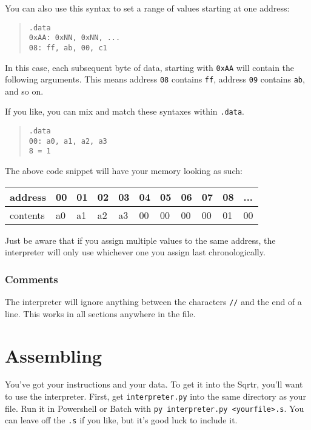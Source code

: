 \documentclass[12pt, oneside]{memoir}
\newcommand{\header}[1]{{\color{header}\texttt{#1}}}
\begin{document}
You can also use this syntax to set a range of values starting at one address:

\begin{quotation}\texttt{\header{.data}\\
    {\color{imm}0xAA}: {\color{imm}0xNN}, {\color{imm}0xNN}, ...\\
    {\color{imm}08}: {\color{imm}ff}, {\color{imm}ab}, {\color{imm}00}, {\color{imm}c1}
}\end{quotation}

In this case, each subsequent byte of data, starting with \texttt{{\color{imm}0xAA}} will contain the following arguments. This means address \texttt{{\color{imm}08}} contains \texttt{{\color{imm}ff}}, address \texttt{{\color{imm}09}} contains \texttt{{\color{imm}ab}}, and so on.

If you like, you can mix and match these syntaxes within \header{.data}.
\begin{quotation}\texttt{\header{.data}\\
    {\color{imm}00}: {\color{imm}a0}, {\color{imm}a1}, {\color{imm}a2}, {\color{imm}a3}\\
    {\color{imm}8} = {\color{imm}1}
}\end{quotation}
The above code snippet will have your memory looking as such:
\begin{table}[H]
    \begin{tabular}{|l|l|l|l|l|l|l|l|l|l|l|}
    \hline
    address  & 00 & 01 & 02 & 03 & 04 & 05 & 06 & 07 & 08 & ... \\ \hline
    contents & a0 & a1 & a2 & a3 & 00 & 00 & 00 & 00 & 01 & 00  \\ \hline
    \end{tabular}
\end{table}

Just be aware that if you assign multiple values to the same address, the interpreter will only use whichever one you assign last chronologically.

\subsection{Comments}
The interpreter will ignore anything between the characters \texttt{//} and the end of a line. This works in all sections anywhere in the file.

\chapter{Assembling}
You've got your instructions and your data. To get it into the Sqrtr, you'll want to use the interpreter. First, get \texttt{interpreter.py} into the same directory as your file. Run it in Powershell or Batch with \texttt{py interpreter.py <yourfile>.s}. You can leave off the \texttt{.s} if you like, but it's good luck to include it.
\end{document}
